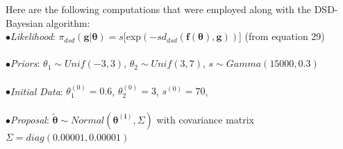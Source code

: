 \documentclass[botnum, fleqn]{unmeethesis}
\begin{document}
Here are the following computations that were employed along with the DSD-Bayesian algorithm:\\
\indent $\bullet$\emph{Likelihood}: $\pi_{dsd}(\bm{g}|\bm{\theta})=s$[exp$(-sd_{dsd}(\bm{f}(\bm{\theta}),\bm{g}))$] (from equation 29)\\ \\
\indent $\bullet$\emph{Priors}: $\theta_1\sim Unif(-3,3)$,  $\theta_2\sim Unif(3,7)$,  $s\sim Gamma(15000,0.3)$\\ \\
\overfullrule=0pt \indent $\bullet$\emph{Initial Data}: $\theta_1^{(0)}=0.6$, \hspace{0.5cm} $\theta_2^{(0)}=3$, \hspace{0.5cm} $s^{(0)}=70$, \hspace{0.5cm} \\\\
\indent $\bullet$\emph{Proposal}: $\widetilde{\bm{\theta}} \sim Normal(\bm{\theta^{(i)}},\Sigma)$ with covariance matrix $\Sigma=diag(0.00001,0.00001)$\\
\end{document}
